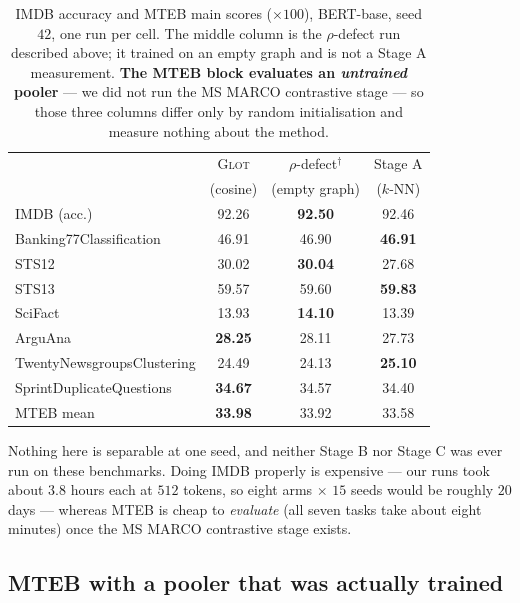 \documentclass{article}
\begin{document}
\begin{table}[h]
\caption{IMDB accuracy and MTEB main scores ($\times 100$), BERT-base, seed
$42$, one run per cell. The middle column is the $\rho$-defect run described
above; it trained on an empty graph and is not a Stage A measurement.
\textbf{The MTEB block evaluates an \emph{untrained} pooler} --- we did not run
the MS MARCO contrastive stage --- so those three columns differ only by random
initialisation and measure nothing about the method.}
\label{tab:docmteb}
\begin{center}
\small
\begin{tabular}{lccc}
\toprule
 & \textsc{Glot} & $\rho$-defect$^{\dagger}$ & Stage A \\
 & (cosine) & (empty graph) & ($k$-NN) \\
\midrule
IMDB (acc.) & 92.26 & \textbf{92.50} & 92.46 \\
\midrule
Banking77Classification    & 46.91 & 46.90 & \textbf{46.91} \\
STS12                      & 30.02 & \textbf{30.04} & 27.68 \\
STS13                      & 59.57 & 59.60 & \textbf{59.83} \\
SciFact                    & 13.93 & \textbf{14.10} & 13.39 \\
ArguAna                    & \textbf{28.25} & 28.11 & 27.73 \\
TwentyNewsgroupsClustering & 24.49 & 24.13 & \textbf{25.10} \\
SprintDuplicateQuestions   & \textbf{34.67} & 34.57 & 34.40 \\
\midrule
MTEB mean                  & \textbf{33.98} & 33.92 & 33.58 \\
\bottomrule
\end{tabular}
\end{center}
\end{table}

Nothing here is separable at one seed, and neither Stage B nor Stage C was ever
run on these benchmarks. Doing IMDB properly is expensive --- our runs took
about $3.8$ hours each at $512$ tokens, so eight arms $\times$ $15$ seeds would
be roughly $20$ days --- whereas MTEB is cheap to \emph{evaluate} (all seven
tasks take about eight minutes) once the MS MARCO contrastive stage exists.

\subsection{MTEB with a pooler that was actually trained}
\label{app:mteb3}
\end{document}
